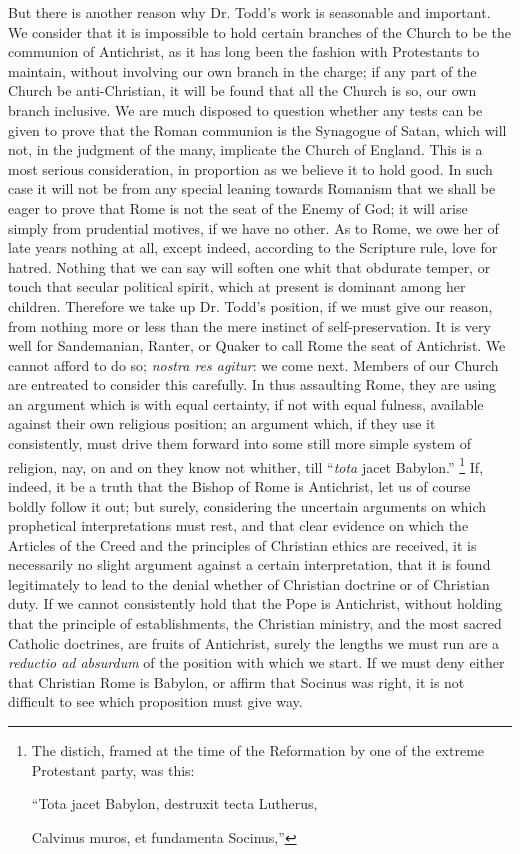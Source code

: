 But there is another reason why Dr. Todd's work is seasonable and
important. We consider that it is impossible to hold certain branches
of the Church to be the communion of Antichrist, as it has long been
the fashion with Protestants to maintain, without involving our own
branch in the charge; if any part of the Church be anti-Christian, it
will be found that all the Church is so, our own branch inclusive. We
are much disposed to question whether any tests can be given to prove
that the Roman communion is the Synagogue of Satan, which will not, in
the judgment of the many, implicate the Church of England. This is a
most serious consideration, in proportion as we believe it to hold
good. In such case it will not be from any special leaning towards
Romanism that we shall be eager to prove that Rome is not the seat of
the Enemy of God; it will arise simply from prudential motives, if we
have no other. As to Rome, we owe her of late years nothing at all,
except indeed, according to the Scripture rule, love for hatred.
Nothing that we can say will soften one whit that obdurate temper, or
touch that secular political spirit, which at present is dominant
among her children. Therefore we take up Dr. Todd's position, if we
must give our reason, from nothing more or less than the mere instinct
of self-preservation. It is very well for Sandemanian, Ranter, or
Quaker to call Rome the seat of Antichrist. We cannot afford to do so;
\emph{nostra res agitur}: we come next. Members of our Church
are entreated to consider this carefully. In thus assaulting Rome,
they are using an argument which is with equal certainty, if not with
equal fulness, available against their own religious position; an
argument which, if they use it consistently, must drive them forward
into some still more simple system of religion, nay, on and on they
know not whither, till ``\emph{tota} jacet Babylon.'' \footnote{The distich, framed at the time of the Reformation by one of the
extreme Protestant party, was this:

``Tota jacet Babylon, destruxit tecta Lutherus,

Calvinus muros, et fundamenta Socinus,''} If, indeed, it be a truth that the Bishop of Rome is
Antichrist, let us of course boldly follow it out; but surely,
considering the uncertain arguments on which prophetical
interpretations must rest, and that clear evidence on which the
Articles of the Creed and the principles of Christian ethics are
received, it is necessarily no slight argument against a certain
interpretation, that it is found legitimately to lead to the denial
whether of Christian doctrine or of Christian duty. If we cannot
consistently hold that the Pope is Antichrist, without holding that
the principle of establishments, the Christian ministry, and the most
sacred Catholic doctrines, are fruits of Antichrist, surely the
lengths we must run are a \emph{reductio ad absurdum} of the position
with which we start. If we must deny either that Christian Rome is
Babylon, or affirm that Socinus was right, it is not difficult to see
which proposition must give way.

